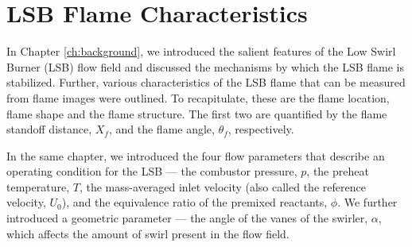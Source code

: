 \chapter{LSB Flame Characteristics}
\label{ch:lsb}






In Chapter \ref{ch:background}, we introduced the salient features of the Low Swirl Burner (LSB) flow field and discussed the mechanisms by which the LSB flame is stabilized.
Further, various characteristics of the LSB flame that can be measured from flame images were outlined.
To recapitulate, these are the flame location, flame shape and the flame structure.
The first two are quantified by the flame standoff distance, \(X_f\), and the flame angle, \(\theta_f\), respectively.

In the same chapter, we introduced the four flow parameters that describe an operating condition for the LSB --- the combustor pressure, \(p\), the preheat temperature, \(T\), the mass-averaged inlet velocity (also called the reference velocity, \(U_0\)), and the equivalence ratio of the premixed reactants, \(\phi\).
We further introduced a geometric parameter --- the angle of the vanes of the swirler, \(\alpha\), which affects the amount of swirl present in the flow field.


